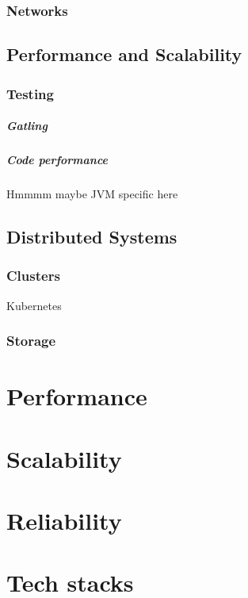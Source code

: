 \documentclass[a4paper, 11pt]{book}
\begin{document}
    \subsection{Networks}


    \section{Performance and Scalability}

    \subsection{Testing}

    \paragraph{Gatling}

    \paragraph{Code performance}
    Hmmmm maybe JVM specific here


    \section{Distributed Systems}

    \subsection{Clusters}
    Kubernetes

    \subsection{Storage}


    \chapter{Performance}


    \chapter{Scalability}


    \chapter{Reliability}


    \chapter{Tech stacks}
\end{document}
